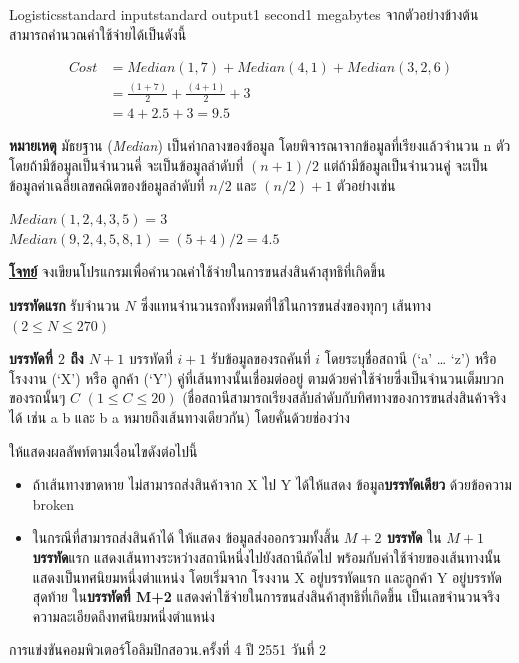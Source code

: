 \documentclass[11pt,a4paper]{article}
\begin{document}
\begin{problem}{Logistics}{standard input}{standard output}{1 second}{1 megabytes}
จากตัวอย่างข้างต้นสามารถคำนวณค่าใช้จ่ายได้เป็นดังนี้

\begin{align}
Cost &= Median(1,7) + Median(4,1) + Median(3,2,6) \tag*{}\\
&= \frac{(1+7)}{2} + \frac{(4+1)}{2} + 3 \tag*{}\\
&= 4 + 2.5 + 3 = 9.5 \tag*{}
\end{align}

\textbf{หมายเหตุ }มัธยฐาน (\textit{Median}) เป็นค่ากลางของข้อมูล โดยพิจารณาจากข้อมูลที่เรียงแล้วจำนวน n ตัว โดยถ้ามีข้อมูลเป็นจำนวนคี่ จะเป็นข้อมูลลำดับที่ $(n+1)/2$ แต่ถ้ามีข้อมูลเป็นจำนวนคู่ จะเป็นข้อมูลค่าเฉลี่ยเลขคณิตของข้อมูลลำดับที่ $n/2$ และ $(n/2)+1$ ตัวอย่างเช่น

$Median (1, 2, 4, 3, 5)     = 3 $ \\
$Median (9, 2, 4, 5, 8, 1)  = (5 + 4)/2 = 4.5 $

\bigskip
\underline{\textbf{โจทย์}}  จงเขียนโปรแกรมเพื่อคำนวณค่าใช้จ่ายในการขนส่งสินค้าสุทธิที่เกิดขึ้น

\InputFile

\textbf{บรรทัดแรก} รับจำนวน $N$ ซึ่งแทนจำนวนรถทั้งหมดที่ใช้ในการขนส่งของทุกๆ เส้นทาง $(2 \leq N \leq 270)$

\textbf{บรรทัดที่ $2$ ถึง $N+1$} บรรทัดที่ $i+1$ รับข้อมูลของรถคันที่ $i$ โดยระบุชื่อสถานี (‘a’ … ‘z’) หรือ โรงงาน (‘X’) หรือ ลูกค้า (‘Y’) คู่ที่เส้นทางนั้นเชื่อมต่ออยู่ ตามด้วยค่าใช้จ่ายซึ่งเป็นจำนวนเต็มบวกของรถนั้นๆ $C$ $(1 \leq C \leq 20)$ (ชื่อสถานีสามารถเรียงสลับลำดับกับทิศทางของการขนส่งสินค้าจริงได้ เช่น a b และ b a หมายถึงเส้นทางเดียวกัน) โดยคั่นด้วยช่องว่าง

\OutputFile

ให้แสดงผลลัพท์ตามเงื่อนไขดังต่อไปนี้
\begin{itemize}

\item ถ้าเส้นทางขาดหาย ไม่สามารถส่งสินค้าจาก X ไป Y ได้ให้แสดง ข้อมูล\textbf{บรรทัดเดียว} ด้วยข้อความ broken
\item ในกรณีที่สามารถส่งสินค้าได้ ให้แสดง ข้อมูลส่งออกรวมทั้งสิ้น \textbf{$M+2$ บรรทัด}
ใน \textbf{$M+1$ บรรทัด}แรก แสดงเส้นทางระหว่างสถานีหนึ่งไปยังสถานีถัดไป พร้อมกับค่าใช้จ่ายของเส้นทางนั้น แสดงเป็นทศนิยมหนึ่งตำแหน่ง โดยเริ่มจาก โรงงาน X อยู่บรรทัดแรก และลูกค้า Y อยู่บรรทัดสุดท้าย
ใน\textbf{บรรทัดที่ M+2} แสดงค่าใช้จ่ายในการขนส่งสินค้าสุทธิที่เกิดขึ้น เป็นเลขจำนวนจริง ความละเอียดถึงทศนิยมหนึ่งตำแหน่ง
\end{itemize}
\Examples

\begin{example}
%
%
\end{example}
\begin{example}
%
\end{example}


\Source

การแข่งขันคอมพิวเตอร์โอลิมปิกสอวน.ครั้งที่ 4 ปี 2551 วันที่ 2

\end{problem}
\end{document}
